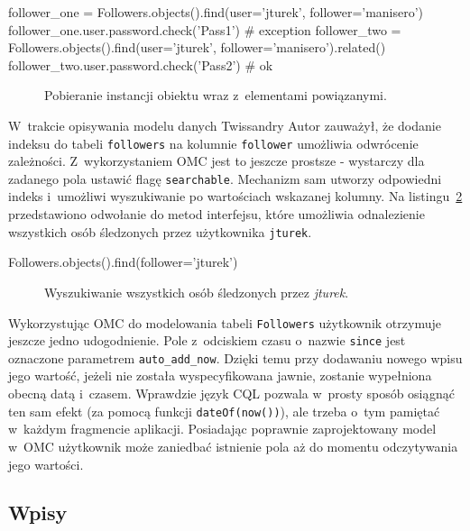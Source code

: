 \begin{verbbox}
	follower_one = Followers.objects().find(user='jturek', 
	                   follower='manisero')
	follower_one.user.password.check('Pass1') # exception
	follower_two = Followers.objects().find(user='jturek',
	                   follower='manisero').related()
	follower_two.user.password.check('Pass2') # ok
\end{verbbox}

\begin{figure}[ht!]
	\centering
	\theverbbox
	\caption{Pobieranie instancji obiektu wraz z~elementami powiązanymi.}
	\label{vrb:omc_twissandra_followers_relation_eager}
\end{figure}

W~trakcie opisywania modelu danych Twissandry Autor zauważył, że dodanie indeksu do tabeli \verb+followers+ na kolumnie \verb+follower+ umożliwia odwrócenie zależności. Z~wykorzystaniem OMC jest to jeszcze prostsze - wystarczy dla zadanego pola ustawić flagę \verb+searchable+. Mechanizm sam utworzy odpowiedni indeks i~umożliwi wyszukiwanie po wartościach wskazanej kolumny. Na listingu~\ref{vrb:omc_twissandra_searching_followers} przedstawiono odwołanie do metod interfejsu, które umożliwia odnalezienie wszystkich osób śledzonych przez użytkownika \verb+jturek+.

\begin{verbbox}
	Followers.objects().find(follower='jturek')
\end{verbbox}

\begin{figure}[ht!]
	\centering
	\theverbbox
	\caption{Wyszukiwanie wszystkich osób śledzonych przez \emph{jturek}.}
	\label{vrb:omc_twissandra_searching_followers}
\end{figure}

Wykorzystując OMC do modelowania tabeli \verb+Followers+ użytkownik otrzymuje jeszcze jedno udogodnienie. Pole z~odciskiem czasu o~nazwie \verb+since+ jest oznaczone parametrem \verb+auto_add_now+. Dzięki temu przy dodawaniu nowego wpisu jego wartość, jeżeli nie została wyspecyfikowana jawnie, zostanie wypełniona obecną datą i~czasem. Wprawdzie język CQL pozwala w~prosty sposób osiągnąć ten sam efekt (za pomocą funkcji \verb+dateOf(now())+), ale trzeba o~tym pamiętać w~każdym fragmencie aplikacji. Posiadając poprawnie zaprojektowany model w~OMC użytkownik może zaniedbać istnienie pola aż do momentu odczytywania jego wartości.

\subsection{Wpisy}

